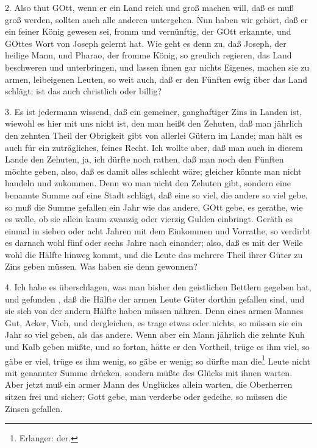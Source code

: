 2. Also thut GOtt, wenn er ein Land reich und groß machen will, daß es muß groß werden, sollten auch alle anderen untergehen. Nun haben wir gehört, daß er ein feiner König gewesen sei, fromm und vernünftig, der GOtt erkannte, und GOttes Wort von Joseph gelernt hat. Wie geht es denn zu, daß Joseph, der heilige Mann, und Pharao, der fromme König, so greulich regieren, das Land beschweren und unterbringen, und lassen ihnen gar nichts Eigenes, machen sie zu armen, leibeigenen Leuten, so weit auch, daß er den Fünften ewig über das Land schlägt; ist das auch christlich oder billig?

3. Es ist jedermann wissend, daß ein gemeiner, ganghaftiger Zins in Landen ist, wiewohl es hier mit uns nicht ist, den man heißt den Zehuten, daß man jährlich den zehnten Theil der Obrigkeit gibt von allerlei Gütern im Lande; man hält es auch für ein zuträgliches, feines Recht. Ich wollte aber, daß man auch in diesem Lande den Zehuten, ja, ich dürfte noch rathen, daß man noch den Fünften möchte geben, also, daß es damit alles schlecht wäre; gleicher könnte man nicht handeln und zukommen. Denn wo man nicht den Zehuten gibt, sondern eine benannte Summe auf eine Stadt schlägt, daß eine so viel, die andere so viel gebe, so muß die Summe gefallen ein Jahr wie das andere, GOtt gebe, es gerathe, wie es wolle, ob sie allein kaum zwanzig oder vierzig Gulden einbringt. Geräth es einmal in sieben oder acht Jahren mit dem Einkommen und Vorrathe, so verdirbt es darnach wohl fünf oder sechs Jahre nach einander; also, daß es mit der Weile wohl die Hälfte hinweg kommt, und die Leute das mehrere Theil ihrer Güter zu Zins geben müssen. Was haben sie denn gewonnen?

4. Ich habe es überschlagen, was man bisher den geistlichen Bettlern gegeben hat, und gefunden
, daß die Hälfte der armen Leute Güter dorthin gefallen sind, und sie sich von der andern Hälfte haben müssen nähren. Denn eines armen Mannes Gut, Acker, Vieh, und dergleichen, es trage etwas oder nichts, so müssen sie ein Jahr so viel geben, als das andere. Wenn aber ein Mann jährlich die zehnte Kuh und Kalb geben müßte, und so fortan, hätte er den Vortheil, trüge es ihm viel, so gäbe er viel, trüge es ihm wenig, so gäbe er wenig; so dürfte man die\footnote{Erlanger: der.} Leute nicht mit genannter Summe drücken, sondern müßte des Glücks mit ihnen warten. Aber jetzt muß ein armer Mann des Unglückes allein warten, die Oberherren sitzen frei und sicher; Gott gebe, man verderbe oder gedeihe, so müssen die Zinsen gefallen.

